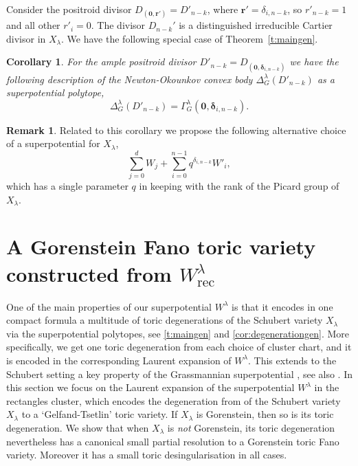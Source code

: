 \documentclass{amsart}
\newtheorem{corollary}[thm]{Corollary}
\theoremstyle{definition}
\newtheorem{remark}[thm]{Remark}
\numberwithin{equation}{section}
\newcommand{\LW}[1]{{\color{blue} \sf ($\clubsuit$ LW #1 $\clubsuit$)}}
\newcommand{\rect}{\mathrm{rec}}
\begin{document}
 Consider the positroid divisor $D_{(\mathbf 0,\mathbf {r'})}=D'_{n-k}$, where $\mathbf r'=\delta_{i,n-k}$, so  $r'_{n-k}=1$ and all other $r'_i=0$. The divisor $D_{n-k}'$ is a distinguished irreducible Cartier divisor in $X_\lambda$. We have the following special case of Theorem~\ref{t:maingen}. 

\begin{corollary} For the ample positroid divisor $D'_{n-k}=D_{(\mathbf 0,\mathbf\delta_{i,n-k})}$ we have the following description of the Newton-Okounkov convex body $\Delta_G^\lambda(D'_{n-k})$ as a superpotential polytope,
\[
\Delta_G^\lambda(D'_{n-k})=\Gamma^\lambda_G(\mathbf 0,\mathbf\delta_{i,n-k}).
\]
\end{corollary}

\begin{remark}
Related to this corollary we propose the following alternative choice of a superpotential for $X_\lambda$,
\[
\sum_{j=0}^d W_j + \sum_{i=0}^{n-1} q^{\delta_{i,n-k}}W'_i,
\]
which has a single parameter $q$ in keeping with the rank of the Picard group of $X_\lambda$.
\end{remark}






\section{A Gorenstein Fano toric variety 
constructed from  $W_{\rect}^{\lambda}$}\label{s:toric}




One of the main properties of our superpotential $W^\lambda$ is that it encodes in one compact formula a multitude of toric degenerations of the Schubert variety $X_\lambda$ via
the superpotential polytopes, see 
\cref{t:maingen}
and \cref{cor:degenerationgen}. 
More specifically, 
we get one toric degeneration from each choice of cluster chart, and it is
encoded in the corresponding  Laurent expansion of $W^\lambda$. 
This extends to the Schubert setting a key property of the Grassmannian superpotential \cite{RW}, see also \cite{SW1}. In this section we focus on the Laurent expansion of the superpotential $W^\lambda$ in 
the rectangles cluster, which encodes the degeneration from \cite{GL} of the Schubert variety $X_{\lambda}$ to a `Gelfand-Tsetlin' toric variety. 
If $X_\lambda$ is Gorenstein, then so is its toric degeneration.  
We show that when $X_\lambda$ is \textit{not} Gorenstein, 
its toric degeneration nevertheless has a canonical small partial resolution to a  
Gorenstein toric Fano variety. Moreover it has a small toric desingularisation in all cases. 
\end{document}
